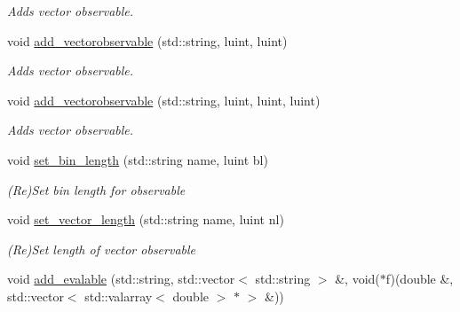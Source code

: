 \begin{CompactItemize}
\begin{CompactList}\small\item\em Adds vector observable. \item\end{CompactList}\item 
\hypertarget{classmeasurements_59ec7d2653135ba155a227e6309479cc}{
void \hyperlink{classmeasurements_59ec7d2653135ba155a227e6309479cc}{add\_\-vectorobservable} (std::string, luint, luint)}
\label{classmeasurements_59ec7d2653135ba155a227e6309479cc}

\begin{CompactList}\small\item\em Adds vector observable. \item\end{CompactList}\item 
\hypertarget{classmeasurements_38c2a056ae42b26c529d1620cf6a3536}{
void \hyperlink{classmeasurements_38c2a056ae42b26c529d1620cf6a3536}{add\_\-vectorobservable} (std::string, luint, luint, luint)}
\label{classmeasurements_38c2a056ae42b26c529d1620cf6a3536}

\begin{CompactList}\small\item\em Adds vector observable. \item\end{CompactList}\item 
\hypertarget{classmeasurements_b2a58c30090b7f6288ec5da77f10921c}{
void \hyperlink{classmeasurements_b2a58c30090b7f6288ec5da77f10921c}{set\_\-bin\_\-length} (std::string name, luint bl)}
\label{classmeasurements_b2a58c30090b7f6288ec5da77f10921c}

\begin{CompactList}\small\item\em (Re)Set bin length for observable \item\end{CompactList}\item 
\hypertarget{classmeasurements_9e6137a3303c777ac9407fde54f56fdb}{
void \hyperlink{classmeasurements_9e6137a3303c777ac9407fde54f56fdb}{set\_\-vector\_\-length} (std::string name, luint nl)}
\label{classmeasurements_9e6137a3303c777ac9407fde54f56fdb}

\begin{CompactList}\small\item\em (Re)Set length of vector observable \item\end{CompactList}\item 
\hypertarget{classmeasurements_5541c3771b0087dbaac3367e7c6e5ed4}{
void \hyperlink{classmeasurements_5541c3771b0087dbaac3367e7c6e5ed4}{add\_\-evalable} (std::string, std::vector$<$ std::string $>$ \&, void($\ast$f)(double \&, std::vector$<$ std::valarray$<$ double $>$ $\ast$ $>$ \&))}
\label{classmeasurements_5541c3771b0087dbaac3367e7c6e5ed4}


\end{CompactItemize}
